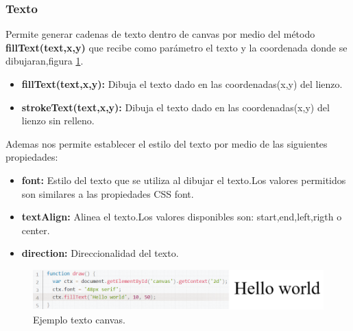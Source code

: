 \subsubsection*{Texto}
Permite generar cadenas de texto dentro de canvas por medio del método \textbf{fillText(text,x,y)} que recibe como parámetro el texto y la coordenada donde se dibujaran,figura \ref{fig:Texto_Canvas}.
\begin{itemize}
\item \textbf{fillText(text,x,y):} Dibuja el texto dado en las coordenadas(x,y) del lienzo.
\item \textbf{strokeText(text,x,y):} Dibuja el texto dado en las coordenadas(x,y) del lienzo sin relleno.
\end{itemize}
Ademas nos permite establecer el estilo del texto por medio de las siguientes propiedades:
\begin{itemize}
\item \textbf{font:} Estilo del texto que se utiliza al dibujar el texto.Los valores permitidos son similares a las propiedades CSS font.
\item \textbf{textAlign:} Alinea el texto.Los valores disponibles son: start,end,left,rigth o center.
\item \textbf{direction:} Direccionalidad del texto.
\end{itemize}
\begin{figure}[!h]
\begin{center}
   \includegraphics[width=0.8\linewidth]{Figures/Texto_Canvas}
	\decoRule
	\caption[Ejemplo texto canvas]{Ejemplo texto canvas.}
\label{fig:Texto_Canvas}
\end{center}
\end{figure}
